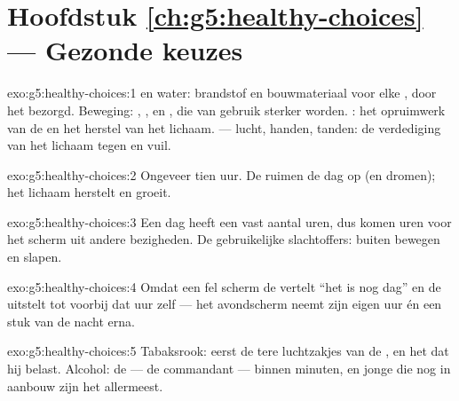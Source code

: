 \section*{Hoofdstuk \ref{ch:g5:healthy-choices} --- Gezonde keuzes}

\begin{solution}{exo:g5:healthy-choices:1}
 en water: brandstof en bouwmateriaal voor elke , door
het  bezorgd. Beweging: , ,  en , die van
gebruik sterker worden. : het opruimwerk van de  en het
herstel van het lichaam.  --- lucht, handen, tanden: de
verdediging van het lichaam tegen  en vuil.
\end{solution}

\begin{solution}{exo:g5:healthy-choices:2}
Ongeveer tien uur. De  ruimen de dag op (en dromen); het lichaam
herstelt en groeit.
\end{solution}

\begin{solution}{exo:g5:healthy-choices:3}
Een dag heeft een vast aantal uren, dus komen uren voor het scherm uit
andere bezigheden. De gebruikelijke slachtoffers: buiten bewegen en slapen.
\end{solution}

\begin{solution}{exo:g5:healthy-choices:4}
Omdat een fel scherm de  vertelt ``het is nog dag'' en de 
uitstelt tot voorbij dat uur zelf --- het avondscherm neemt zijn eigen
uur én een stuk van de nacht erna.
\end{solution}

\begin{solution}{exo:g5:healthy-choices:5}
Tabaksrook: eerst de tere luchtzakjes van de , en het  dat hij
belast. Alcohol: de  --- de commandant --- binnen minuten, en
jonge  die nog in aanbouw zijn het allermeest.
\end{solution}

